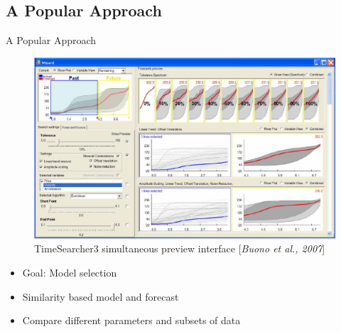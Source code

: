 \documentclass[10pt]{beamer}
\begin{document}
\subsection{A Popular Approach}


\begin{frame}{A Popular Approach}
	\centering
	\begin{figure}[htbp]
		\includegraphics[scale=.17]{images/TimeSearcher}
		\caption{TimeSearcher3 simultaneous preview interface [\textit{Buono et al., 2007}]}
	\end{figure}
	\begin{itemize}
		\item Goal: Model selection
		\item Similarity based model and forecast
		\item Compare different parameters and subsets of data 
	\end{itemize}
\end{frame}


\end{document}
